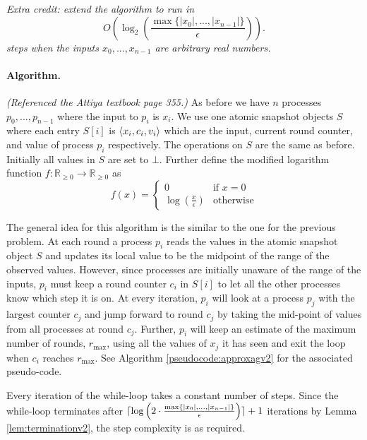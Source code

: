 \documentclass[11pt]{article}
\newcommand\R{\mathbb{R}}
\DeclarePairedDelimiter\ceil{\lceil}{\rceil}
\DeclarePairedDelimiter\anglebrac{\langle}{\rangle}
\begin{document}
\emph{Extra credit: extend the algorithm to run in 
\[O\left(\log_2\left(\frac{\max\{|x_0|, ..., |x_{n-1}|\}}{\epsilon}\right)\right).\] 
steps when the inputs $x_0, ..., x_{n-1}$ are arbitrary real numbers.}

\paragraph{Algorithm.}
\emph{(Referenced the Attiya textbook page 355.)} As before we have $n$ processes $p_0, ..., p_{n-1}$ where the input to $p_i$ is $x_i$. We use one atomic snapshot objects $S$ where each entry $S[i]$ is $\anglebrac{x_i,c_i,v_i}$ which are the input, current round counter, and value of process $p_i$ respectively. The operations on $S$ are the same as before. Initially all values in $S$ are set to $\bot$. Further define the modified logarithm function $f: \R_{\geq 0} \rightarrow \R_{\geq 0}$ as 
\[f(x) = \begin{cases}
0 &\mbox{if } x = 0 \\
\log\left(\frac{x}{\epsilon}\right) &\mbox{otherwise}
\end{cases}\]

The general idea for this algorithm is the similar to the one for the previous problem. At each round a process $p_i$ reads the values in the atomic snapshot object $S$ and updates its local value to be the midpoint of the range of the observed values. However, since processes are initially unaware of the range of the inputs, $p_i$ must keep a round counter $c_i$ in $S[i]$ to let all the other processes know which step it is on. At every iteration, $p_i$ will look at a process $p_j$ with the largest counter $c_j$ and jump forward to round $c_j$ by taking the mid-point of values from all processes at round $c_j$. Further, $p_i$ will keep an estimate of the maximum number of rounds, $r_{\max}$, using all the values of $x_j$ it has seen and exit the loop when $c_i$ reaches $r_{\max}$. See Algorithm \ref{pseudocode:approxagv2} for the associated pseudo-code.

Every iteration of the while-loop takes a constant number of steps. Since the while-loop terminates after $\ceil{\log\left(2\cdot\frac{\max\{|x_0|, ..., |x_{n-1}|\}}{\epsilon}\right)}+1$ iterations by Lemma \ref{lem:terminationv2}, the step complexity is as required. 
\end{document}
